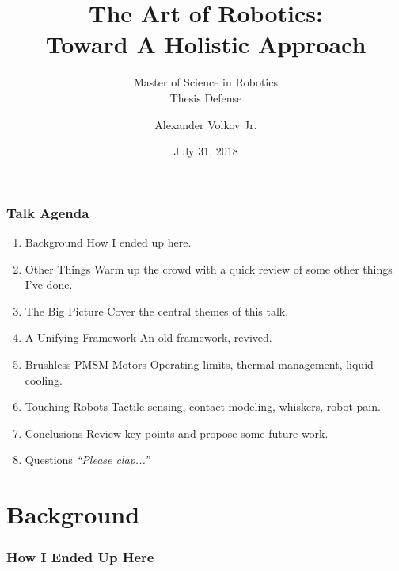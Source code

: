 \documentclass[aspectratio=169]{beamer}
\title{The Art of Robotics:\\\vspace{0.2em}\huge{Toward A Holistic Approach}}
\subtitle{Master of Science in Robotics\\Thesis Defense}
\author{Alexander Volkov Jr.}
\date{July 31, 2018}
\begin{document}
	\setcounter{showProgressBar}{0}
	\setcounter{showSlideNumbers}{0}

	\frame{\titlepage}

	\begin{frame}
		\frametitle{Talk Agenda}
		\begin{enumerate}
			\setlength{\itemsep}{4mm}
			\item Background
				\textcolor{AVThesisGrey}{\footnotesize\hspace{1em} How I ended up here.}
				
			\item Other Things
				\textcolor{AVThesisGrey}{\footnotesize\hspace{1em} Warm up the crowd with a quick review of some other things I've done.}
			
			\item The Big Picture
				\textcolor{AVThesisGrey}{\footnotesize\hspace{1em} Cover the central themes of this talk.}
			
			\item A Unifying Framework
				\textcolor{AVThesisGrey}{\footnotesize\hspace{1em} An old framework, revived.}
			
			\item Brushless PMSM Motors
				\textcolor{AVThesisGrey}{\footnotesize\hspace{1em} Operating limits, thermal management, liquid cooling.}
	
			\item Touching Robots
				\textcolor{AVThesisGrey}{\footnotesize\hspace{1em} Tactile sensing, contact modeling, whiskers, robot pain.}
			
			\item Conclusions
				\textcolor{AVThesisGrey}{\footnotesize\hspace{1em} Review key points and propose some future work.}
			
			\item Questions
				\textcolor{AVThesisGrey}{\footnotesize\hspace{1em} \emph{``Please clap...''}}
		\end{enumerate}
	\end{frame}

	\setcounter{framenumber}{0}
	\setcounter{showProgressBar}{1}
	\setcounter{showSlideNumbers}{1}
	
	\section{Background}
		\begin{frame}
			\frametitle{How I Ended Up Here}
		
		\end{frame}
\end{document}
